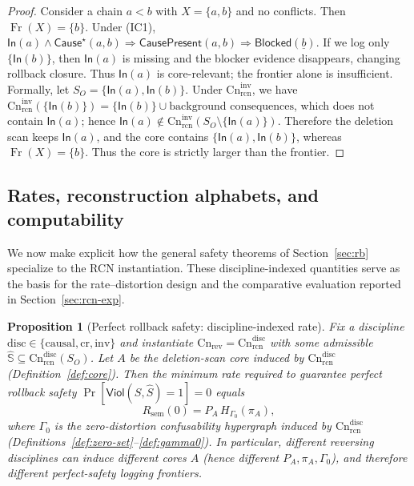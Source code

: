 \documentclass[twoside]{article}
\DeclareMathOperator{\Fr}{Fr}
\newtheorem{proposition}[theorem]{Proposition}
\newcommand{\Cn}{\mathrm{Cn}}
\newcommand{\sem}{\mathrm{sem}}
\newcommand{\1}{\mathbf{1}}
\begin{document}
\begin{proof}
Consider a chain \(a<b\) with \(X=\{a,b\}\) and no conflicts. Then \(\Fr(X)=\{b\}\).
Under (IC1), \(\mathsf{In}(a)\wedge \mathsf{Cause}^\star(a,b)\Rightarrow \mathsf{CausePresent}(a,b)\Rightarrow \mathsf{Blocked}(\underline{b})\).
If we log only \(\{\mathsf{In}(b)\}\), then \(\mathsf{In}(a)\) is missing and the blocker evidence disappears, changing rollback closure.
Thus \(\mathsf{In}(a)\) is core-relevant; the frontier alone is insufficient.
Formally, let \(S_O=\{\mathsf{In}(a),\mathsf{In}(b)\}\).  Under \(\Cn^{\mathrm{inv}}_{\mathrm{rcn}}\),
we have \(\Cn^{\mathrm{inv}}_{\mathrm{rcn}}(\{\mathsf{In}(b)\}) = \{\mathsf{In}(b)\} \cup
\text{background consequences}\), which does not contain \(\mathsf{In}(a)\);
hence \(\mathsf{In}(a)\notin\Cn^{\mathrm{inv}}_{\mathrm{rcn}}(S_O\setminus\{\mathsf{In}(a)\})\).
Therefore the deletion scan keeps \(\mathsf{In}(a)\), and the core contains
\(\{\mathsf{In}(a),\mathsf{In}(b)\}\), whereas \(\Fr(X)=\{b\}\).
Thus the core is strictly larger than the frontier.
\end{proof}


\subsection{Rates, reconstruction alphabets, and computability}
\label{sec:rcn-safety-rates}

We now make explicit how the general safety theorems of Section~\ref{sec:rb} specialize to the RCN instantiation.
These discipline-indexed quantities serve as the basis for the rate–distortion design and the comparative evaluation reported in Section~\ref{sec:rcn-exp}.

\begin{proposition}[Perfect rollback safety: discipline-indexed rate]
\label{prop:rcn-perfect-safety-rate}
Fix a discipline \(\mathrm{disc}\in\{\mathrm{causal},\mathrm{cr},\mathrm{inv}\}\) and instantiate
\(\Cn_{\mathrm{rev}}=\Cn^{\mathrm{disc}}_{\mathrm{rcn}}\) with some admissible \(\hat{\mathbb{S}}\subseteq \Cn^{\mathrm{disc}}_{\mathrm{rcn}}(S_O)\).
Let \(A\) be the deletion-scan core induced by \(\Cn^{\mathrm{disc}}_{\mathrm{rcn}}\) (Definition~\ref{def:core}).
Then the minimum rate required to guarantee perfect rollback safety
\(\Pr[\mathsf{Viol}(S,\hat S)=1]=0\) equals
\[
R_{\sem}(0)=P_A\,H_{\Gamma_0}(\pi_A),
\]
where \(\Gamma_0\) is the zero-distortion confusability hypergraph induced by \(\Cn^{\mathrm{disc}}_{\mathrm{rcn}}\)
(Definitions~\ref{def:zero-set}--\ref{def:gamma0}).
In particular, different reversing disciplines can induce different cores \(A\) (hence different \(P_A,\pi_A,\Gamma_0\)),
and therefore different perfect-safety logging frontiers.
\end{proposition}
\end{document}
